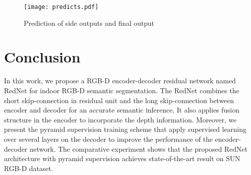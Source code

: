 \documentclass[runningheads]{llncs}
\begin{document}
\begin{figure}[!t]
    \centering
    \texttt{[image: predicts.pdf]}
\caption{Prediction of side outputs and final output}
\label{fig:outputs}
\end{figure}

\section{Conclusion} \label{sec:conclusion}

In this work, we propose a RGB-D encoder-decoder residual network named RedNet for indoor RGB-D semantic segmentation. The RedNet combines the short skip-connection in residual unit and the long skip-connection between encoder and decoder for an accurate semantic inference. It also applies fusion structure in the encoder to incorporate the depth information. Moreover, we present the pyramid supervision training scheme that apply supervised learning over several layers on the decoder to improve the performance of the encoder-decoder network. The comparative experiment shows that the proposed RedNet architecture with pyramid supervision achieves state-of-the-art result on SUN RGB-D dataset.





\end{document}
